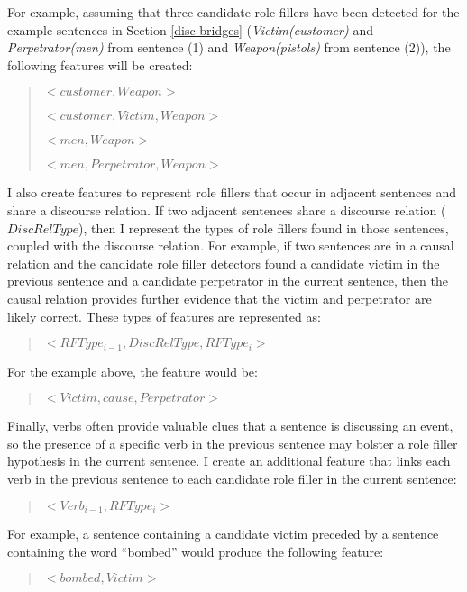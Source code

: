 For example, assuming that three candidate role fillers have been detected
for the example sentences in Section
\ref{disc-bridges} ({\it Victim(customer)} and {\it Perpetrator(men)}
from sentence (1) and {\it Weapon(pistols)} from sentence (2)), the
following features will be created: 
\begin{quote}
{\it $<customer, Weapon>$} 

{\it $<customer, Victim, Weapon>$}

{\it $<men, Weapon>$} 

{\it $<men, Perpetrator, Weapon>$}
\end{quote}

I also create features to represent role fillers that occur in
adjacent sentences and share a discourse relation.  If two adjacent
sentences share a discourse relation ($DiscRelType$), then I
represent the types of role fillers found in those sentences, coupled
with the discourse relation.  For example, if two sentences are in a
causal relation and the candidate role filler detectors found a
candidate victim in the previous sentence and a candidate perpetrator
in the current sentence, then the causal relation provides further
evidence that the victim and perpetrator  are likely correct.
These types of features are represented as:
\begin{quote}
{\it $<RFType_{i-1}, DiscRelType, RFType_{i}>$}
\end{quote}
\vspace*{.08in}
For the  example above, the feature would be:
\begin{quote}
{\it $<Victim, cause, Perpetrator>$}
\end{quote}

Finally, verbs often provide valuable clues that a sentence is
discussing an event, so the presence of a specific verb in the previous sentence may bolster a
role filler hypothesis in the current sentence.   
I create an additional feature that links each verb in
the previous sentence to each candidate role filler in the current sentence: 
\vspace*{.08in}
\begin{quote}
{\it $<Verb_{i-1}, RFType_{i}>$}
\end{quote}
\vspace*{.08in}
For example, a
sentence containing a candidate victim preceded by a sentence containing the word ``bombed'' would produce the following
feature: 
\begin{quote}
{\it $<bombed, Victim>$}
\end{quote}

